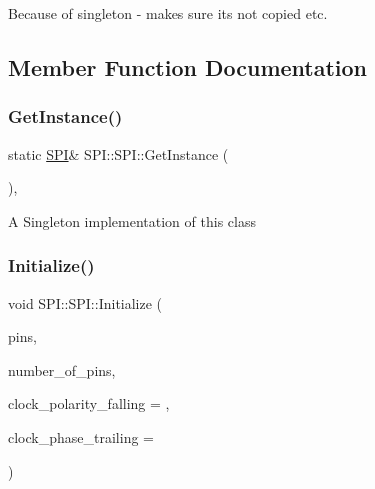 Because of singleton -\/ makes sure its not copied etc. 

\subsection{Member Function Documentation}
\hypertarget{class_s_p_i_1_1_s_p_i_aeb00a468750e8f183eeaca0d0ffaf9f3}{}\label{class_s_p_i_1_1_s_p_i_aeb00a468750e8f183eeaca0d0ffaf9f3} 
\subsubsection{\texorpdfstring{Get\+Instance()}{GetInstance()}}
{\footnotesize\ttfamily static \hyperlink{class_s_p_i_1_1_s_p_i}{S\+PI}\& S\+P\+I\+::\+S\+P\+I\+::\+Get\+Instance (\begin{DoxyParamCaption}{ }\end{DoxyParamCaption})\hspace{0.3cm}{\ttfamily [inline]}, {\ttfamily [static]}}

A Singleton implementation of this class \hypertarget{class_s_p_i_1_1_s_p_i_a8d047c13b1bc93dd9b31c91d7d5081e9}{}\label{class_s_p_i_1_1_s_p_i_a8d047c13b1bc93dd9b31c91d7d5081e9} 
\subsubsection{\texorpdfstring{Initialize()}{Initialize()}}
{\footnotesize\ttfamily void S\+P\+I\+::\+S\+P\+I\+::\+Initialize (\begin{DoxyParamCaption}\item[{\hyperlink{struct_s_p_i_1_1_p_i_n}{P\+IN} $\ast$}]{pins,  }\item[{uint8\+\_\+t}]{number\+\_\+of\+\_\+pins,  }\item[{bool}]{clock\+\_\+polarity\+\_\+falling = {},  }\item[{bool}]{clock\+\_\+phase\+\_\+trailing = {} }\end{DoxyParamCaption})}

